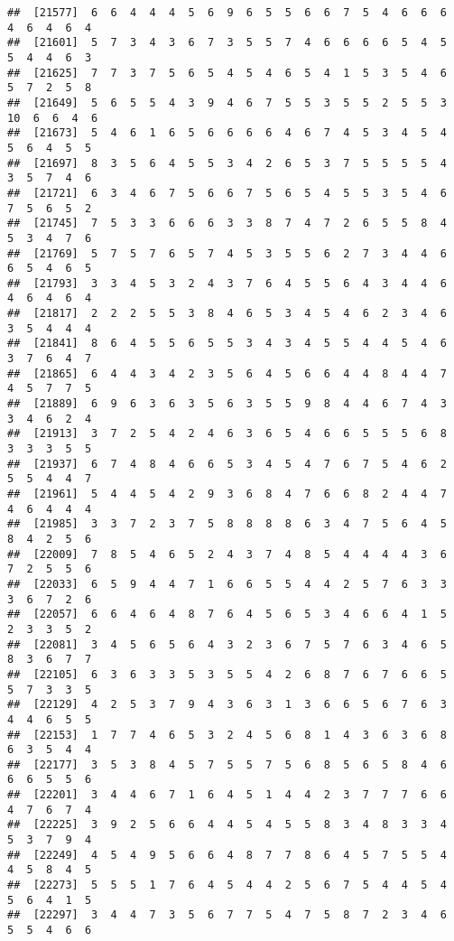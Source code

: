 \documentclass[
]{book}
\begin{document}
\begin{verbatim}
##  [21577]  6  6  4  4  4  5  6  9  6  5  5  6  6  7  5  4  6  6  6  4  6  4  6  4
##  [21601]  5  7  3  4  3  6  7  3  5  5  7  4  6  6  6  6  5  4  5  5  4  4  6  3
##  [21625]  7  7  3  7  5  6  5  4  5  4  6  5  4  1  5  3  5  4  6  5  7  2  5  8
##  [21649]  5  6  5  5  4  3  9  4  6  7  5  5  3  5  5  2  5  5  3 10  6  6  4  6
##  [21673]  5  4  6  1  6  5  6  6  6  6  4  6  7  4  5  3  4  5  4  5  6  4  5  5
##  [21697]  8  3  5  6  4  5  5  3  4  2  6  5  3  7  5  5  5  5  4  3  5  7  4  6
##  [21721]  6  3  4  6  7  5  6  6  7  5  6  5  4  5  5  3  5  4  6  7  5  6  5  2
##  [21745]  7  5  3  3  6  6  6  3  3  8  7  4  7  2  6  5  5  8  4  5  3  4  7  6
##  [21769]  5  7  5  7  6  5  7  4  5  3  5  5  6  2  7  3  4  4  6  6  5  4  6  5
##  [21793]  3  3  4  5  3  2  4  3  7  6  4  5  5  6  4  3  4  4  6  4  6  4  6  4
##  [21817]  2  2  2  5  5  3  8  4  6  5  3  4  5  4  6  2  3  4  6  3  5  4  4  4
##  [21841]  8  6  4  5  5  6  5  5  3  4  3  4  5  5  4  4  5  4  6  3  7  6  4  7
##  [21865]  6  4  4  3  4  2  3  5  6  4  5  6  6  4  4  8  4  4  7  4  5  7  7  5
##  [21889]  6  9  6  3  6  3  5  6  3  5  5  9  8  4  4  6  7  4  3  3  4  6  2  4
##  [21913]  3  7  2  5  4  2  4  6  3  6  5  4  6  6  5  5  5  6  8  3  3  3  5  5
##  [21937]  6  7  4  8  4  6  6  5  3  4  5  4  7  6  7  5  4  6  2  5  5  4  4  7
##  [21961]  5  4  4  5  4  2  9  3  6  8  4  7  6  6  8  2  4  4  7  4  6  4  4  4
##  [21985]  3  3  7  2  3  7  5  8  8  8  8  6  3  4  7  5  6  4  5  8  4  2  5  6
##  [22009]  7  8  5  4  6  5  2  4  3  7  4  8  5  4  4  4  4  3  6  7  2  5  5  6
##  [22033]  6  5  9  4  4  7  1  6  6  5  5  4  4  2  5  7  6  3  3  3  6  7  2  6
##  [22057]  6  6  4  6  4  8  7  6  4  5  6  5  3  4  6  6  4  1  5  2  3  3  5  2
##  [22081]  3  4  5  6  5  6  4  3  2  3  6  7  5  7  6  3  4  6  5  8  3  6  7  7
##  [22105]  6  3  6  3  3  5  3  5  5  4  2  6  8  7  6  7  6  6  5  5  7  3  3  5
##  [22129]  4  2  5  3  7  9  4  3  6  3  1  3  6  6  5  6  7  6  3  4  4  6  5  5
##  [22153]  1  7  7  4  6  5  3  2  4  5  6  8  1  4  3  6  3  6  8  6  3  5  4  4
##  [22177]  3  5  3  8  4  5  7  5  5  7  5  6  8  5  6  5  8  4  6  6  6  5  5  6
##  [22201]  3  4  4  6  7  1  6  4  5  1  4  4  2  3  7  7  7  6  6  4  7  6  7  4
##  [22225]  3  9  2  5  6  6  4  4  5  4  5  5  8  3  4  8  3  3  4  5  3  7  9  4
##  [22249]  4  5  4  9  5  6  6  4  8  7  7  8  6  4  5  7  5  5  4  4  5  8  4  5
##  [22273]  5  5  5  1  7  6  4  5  4  4  2  5  6  7  5  4  4  5  4  5  6  4  1  5
##  [22297]  3  4  4  7  3  5  6  7  7  5  4  7  5  8  7  2  3  4  6  5  5  4  6  6

\end{verbatim}
\end{document}
